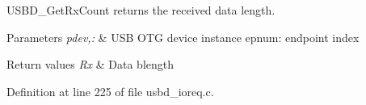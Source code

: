 U\-S\-B\-D\-\_\-\-Get\-Rx\-Count returns the received data length. 


\begin{DoxyParams}{Parameters}
{\em pdev,\-:} & U\-S\-B O\-T\-G device instance epnum\-: endpoint index \\
\hline
\end{DoxyParams}

\begin{DoxyRetVals}{Return values}
{\em Rx} & Data blength \\
\hline
\end{DoxyRetVals}


Definition at line 225 of file usbd\-\_\-ioreq.\-c.

